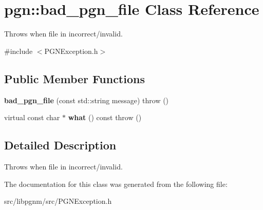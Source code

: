 \hypertarget{classpgn_1_1bad__pgn__file}{
\section{pgn::bad\_\-pgn\_\-file Class Reference}
\label{classpgn_1_1bad__pgn__file}
}


Throws when file in incorrect/invalid.  




{\ttfamily \#include $<$PGNException.h$>$}

\subsection*{Public Member Functions}
\begin{DoxyCompactItemize}
\item 
\hypertarget{classpgn_1_1bad__pgn__file_abc9f72412911141529f6dbfae2b997d4}{
{\bfseries bad\_\-pgn\_\-file} (const std::string message)  throw ()}
\label{classpgn_1_1bad__pgn__file_abc9f72412911141529f6dbfae2b997d4}

\item 
\hypertarget{classpgn_1_1bad__pgn__file_a39a4ffc210896e3fd7bfb1ecce491177}{
virtual const char $\ast$ {\bfseries what} () const   throw ()}
\label{classpgn_1_1bad__pgn__file_a39a4ffc210896e3fd7bfb1ecce491177}

\end{DoxyCompactItemize}


\subsection{Detailed Description}
Throws when file in incorrect/invalid. 

The documentation for this class was generated from the following file:\begin{DoxyCompactItemize}
\item 
src/libpgnm/src/PGNException.h\end{DoxyCompactItemize}
